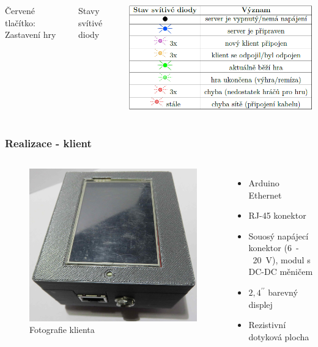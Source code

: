 \documentclass{beamer}
\begin{document}
\begin{frame}
\begin{columns}[c]
{		{\color{red} Červené tlačítko:} Zastavení hry 	
		\begin{table}
			\centering
			\caption{Stavy svítivé diody}
			\includegraphics[width=\textwidth]{img/serverLED.png}
		\end{table}
	}
\end{columns}
\end{frame}

\begin{frame}
\frametitle{Realizace - klient}
\begin{columns}[c]
	\begin{figure}
		\centering
		\includegraphics[width=\textwidth]{img/client_realizace.jpg}
		\caption{Fotografie klienta}
	\end{figure}
%
 		\begin{itemize}
 			\item Arduino Ethernet
 			\item RJ-45 konektor
 			\item Souosý napájecí konektor (6~-~20~V), modul s DC-DC měničem
 			\item $2,4^{\prime\prime}$ barevný displej
 			\item Rezistivní dotyková plocha
 		\end{itemize}	
\end{columns}
\end{frame}
\end{document}
